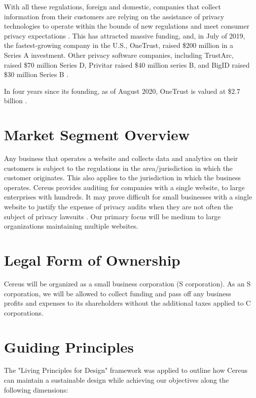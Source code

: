 With all these regulations, foreign and domestic, companies that collect information from their customers are relying on the assistance of privacy technologies to operate within the bounds of new regulations and meet consumer privacy expectations \cite{meehan.forbes.2019}. This has attracted massive funding, and, in July of 2019, the fastest-growing company in the U.S., OneTrust, raised \$200 million in a Series A investment. Other privacy software companies, including TrustArc, raised \$70 million Series D, Privitar raised \$40 million series B, and BigID raised \$30 million Series B \cite{wood.fpf.2019}.

In four years since its founding, as of August 2020, OneTrust is valued at \$2.7 billion \cite{hughes.iapp.2020}.

\section{Market Segment Overview}

Any business that operates a website and collects data and analytics on their customers is subject to the regulations in the area/jurisdiction in which the customer originates. This also applies to the jurisdiction in which the business operates. Cereus provides auditing for companies with a single website, to large enterprises with hundreds. It may prove difficult for small businesses with a single website to justify the expense of privacy audits when they are not often the subject of privacy lawsuits \cite{lanou.2020}. Our primary focus will be medium to large organizations maintaining multiple websites. 

\section{Legal Form of Ownership} \label{legal.ownership}

Cereus will be organized as a small business corporation (S corporation). As an S corporation, we will be allowed to collect funding and pass off any business profits and expenses to its shareholders without the additional taxes applied to C corporations.

\section{Guiding Principles} \label{guiding.principles}

The "Living Principles for Design" framework \cite{brink.aiga.2020} was applied to outline how Cereus can maintain a sustainable design while achieving our objectives along the following dimensions:

